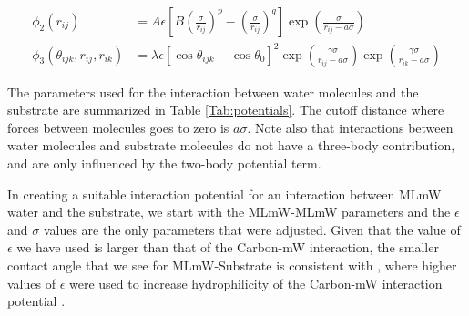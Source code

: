 \documentclass[journal abbreviation, manuscript]{copernicus}
\begin{document}
\begin{align}\label{eq:sw-potential}
\phi_{2}(r_{ij}) &= A\epsilon\left[B(\frac{\sigma}{r_{ij}})^{p} - (\frac{\sigma}{r_{ij}})^{q}\right]\exp \left( \frac{\sigma}{r_{ij}-a\sigma}\right)\\
\phi_{3}(\theta_{ijk}, r_{ij}, r_{ik}) &= \lambda\epsilon[\cos\theta_{ijk} - \cos\theta_0]^2 \exp \left(\frac{\gamma\sigma}{r_{ij}-a\sigma}\right) \exp \left(\frac{\gamma\sigma}{r_{ik}-a\sigma}\right)
\end{align}

The parameters used for the interaction between water molecules and the substrate are summarized in Table \ref{Tab:potentials}. The cutoff distance where forces between molecules goes to zero is $a\sigma$. Note also that interactions between water molecules and substrate molecules do not have a three-body contribution, and are only influenced by the two-body potential term.

In creating a suitable interaction potential for an interaction between MLmW water and the substrate, we start with the MLmW-MLmW parameters and the $\epsilon$ and $\sigma$ values are the only parameters that were adjusted. Given that the value of $\epsilon$ we have used is larger than that of the Carbon-mW interaction, the smaller contact angle that we see for MLmW-Substrate is consistent with \citet{Bi2016}, where higher values of $\epsilon$ were used to increase hydrophilicity of the Carbon-mW interaction potential \cite{Bi2016}.
\end{document}
